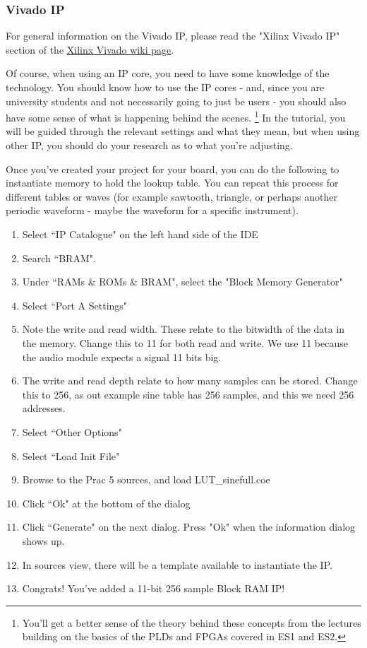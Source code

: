 \subsubsection{Vivado IP}
For general information on the Vivado IP, please read the "Xilinx Vivado IP" section of the \href{http://wiki.ee.uct.ac.za/Xilinx_Vivado#Xilinx_Vivado_IP}{Xilinx Vivado wiki page}.

Of course, when using an IP core, you need to have some knowledge of the technology. You should know how to use the IP cores - and, since you are university students and not necessarily going to just be users - you should also have some sense of what is happening behind the scenes. \footnote{You'll get a better sense of the theory behind these concepts from the lectures building on the basics of the PLDs and FPGAs covered in ES1 and ES2.} In the tutorial, you will be guided through the relevant settings and what they mean, but when using other IP, you should do your research as to what you're adjusting.



Once you've created your project for your board, you can do the following to instantiate memory to hold the lookup table. You can repeat this process for different tables or waves (for example sawtooth, triangle, or perhaps another periodic waveform - maybe the waveform for a specific instrument).
\begin{enumerate}
    \item Select ``IP Catalogue" on the left hand side of the IDE
    \item Search ``BRAM".
    \item Under ``RAMs \& ROMs \& BRAM", select the "Block Memory Generator"
    \item Select ``Port A Settings"
    \item Note the write and read width. These relate to the bitwidth of the data in the memory. Change this to 11 for both read and write. We use 11 because the audio module expects a signal 11 bits big.
    \item The write and read depth relate to how many samples can be stored. Change this to 256, as out example sine table has 256 samples, and this we need 256 addresses.
    \item Select ``Other Options"
    \item Select ``Load Init File"
    \item Browse to the Prac 5 sources, and load LUT\_sinefull.coe
    \item Click ``Ok" at the bottom of the dialog
    \item Click ``Generate" on the next dialog. Press "Ok" when the information dialog shows up.
    \item In sources view, there will be a template available to instantiate the IP.
    \item Congrats! You've added a 11-bit 256 sample Block RAM IP!
\end{enumerate}

